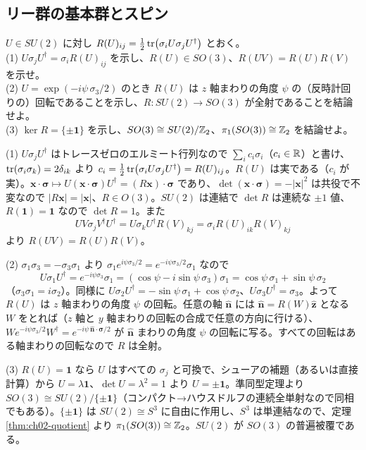 \subsection{リー群の基本群とスピン}

\begin{problem}[難易度 B]\label{ch02-prob-su2so3}
$U\in SU(2)$ に対し $R(U)_{ij}=\tfrac12\tr(\sigma_iU\sigma_jU^\dagger)$ とおく。\\
(1) $U\sigma_jU^\dagger=\sigma_iR(U)_{ij}$ を示し、$R(U)\in SO(3)$、$R(UV)=R(U)R(V)$ を示せ。\\
(2) $U=\exp(-i\psi\,\sigma_3/2)$ のとき $R(U)$ は $z$ 軸まわりの角度 $\psi$ の（反時計回りの）回転であることを示し、$R\colon SU(2)\to SO(3)$ が全射であることを結論せよ。\\
(3) $\ker R=\{\pm\mathbf 1\}$ を示し、$SO(3)\cong SU(2)/\mathbb{Z}_2$、$\pi_1(SO(3))\cong\mathbb{Z}_2$ を結論せよ。
\end{problem}

\begin{solution}
(1) $U\sigma_jU^\dagger$ はトレースゼロのエルミート行列なので $\sum_ic_i\sigma_i$（$c_i\in\mathbb{R}$）と書け、$\tr(\sigma_i\sigma_k)=2\delta_{ik}$ より $c_i=\tfrac12\tr(\sigma_iU\sigma_jU^\dagger)=R(U)_{ij}$。$R(U)$ は実である（$c_i$ が実）。$\bm x\cdot\bm\sigma\mapsto U(\bm x\cdot\bm\sigma)U^\dagger=(R\bm x)\cdot\bm\sigma$ であり、$\det(\bm x\cdot\bm\sigma)=-\lvert\bm x\rvert^2$ は共役で不変なので $\lvert R\bm x\rvert=\lvert\bm x\rvert$、$R\in O(3)$。$SU(2)$ は連結で $\det R$ は連続な $\pm1$ 値、$R(\mathbf 1)=\mathbf 1$ なので $\det R=1$。また
\[
UV\sigma_jV^\dagger U^\dagger=U\sigma_kU^\dagger R(V)_{kj}=\sigma_iR(U)_{ik}R(V)_{kj}
\]
より $R(UV)=R(U)R(V)$。

(2) $\sigma_1\sigma_3=-\sigma_3\sigma_1$ より $\sigma_1e^{i\psi\sigma_3/2}=e^{-i\psi\sigma_3/2}\sigma_1$ なので
\[
U\sigma_1U^\dagger=e^{-i\psi\sigma_3}\sigma_1=(\cos\psi-i\sin\psi\,\sigma_3)\sigma_1=\cos\psi\,\sigma_1+\sin\psi\,\sigma_2
\]
（$\sigma_3\sigma_1=i\sigma_2$）。同様に $U\sigma_2U^\dagger=-\sin\psi\,\sigma_1+\cos\psi\,\sigma_2$、$U\sigma_3U^\dagger=\sigma_3$。よって $R(U)$ は $z$ 軸まわりの角度 $\psi$ の回転。任意の軸 $\hat{\bm n}$ には $\hat{\bm n}=R(W)\hat{\bm z}$ となる $W$ をとれば（$z$ 軸と $y$ 軸まわりの回転の合成で任意の方向に行ける）、$W e^{-i\psi\sigma_3/2}W^\dagger=e^{-i\psi\,\hat{\bm n}\cdot\bm\sigma/2}$ が $\hat{\bm n}$ まわりの角度 $\psi$ の回転に写る。すべての回転はある軸まわりの回転なので $R$ は全射。

(3) $R(U)=\mathbf 1$ なら $U$ はすべての $\sigma_j$ と可換で、シューアの補題（あるいは直接計算）から $U=\lambda\mathbf 1$、$\det U=\lambda^2=1$ より $U=\pm\mathbf 1$。準同型定理より $SO(3)\cong SU(2)/\{\pm\mathbf 1\}$（コンパクト→ハウスドルフの連続全単射なので同相でもある）。$\{\pm\mathbf 1\}$ は $SU(2)\cong S^3$ に自由に作用し、$S^3$ は単連結なので、定理 \ref{thm:ch02-quotient} より $\pi_1(SO(3))\cong\mathbb{Z}_2$。$SU(2)$ が $SO(3)$ の普遍被覆である。
\end{solution}

